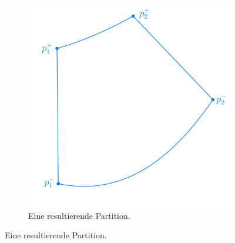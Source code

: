 \documentclass[8pt, aspectratio=169]{beamer}
\begin{document}
\begin{frame}
\begin{minipage}[t]{\textwidth}
\begin{figure}[H]
\begin{subfigure}{.39\textwidth}
				\centering
				\includegraphics[width=.85\textwidth]{../../tec/chambers/62.png}
				\caption{Eine resultierende Partition.}
			\end{subfigure}
		\end{figure}
	\end{minipage}
	\vfill
\end{frame}
\end{document}
